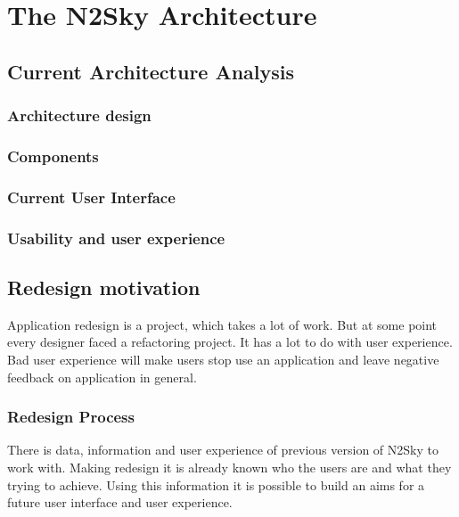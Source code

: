 \section{The N2Sky Architecture}\label{TheN2SkyArchitecture}

\subsection{Current Architecture Analysis}\label{CurrentArchitectureAnalysis}
\subsubsection{Architecture design}\label{Architecturedesign}
\subsubsection{Components}\label{Components}
\subsubsection{Current User Interface}\label{CurrentUserInterface}
\subsubsection{Usability and user experience}\label{Usabilityanduserexperience}



\subsection{Redesign motivation}\label{Redesignmotivation}

Application redesign is a project, which takes a lot of work. But at some point every designer faced a refactoring project. It has a lot to do with user experience. Bad user experience will make users stop use an application and leave negative feedback on application in general. 

\subsubsection{Redesign Process }\label{Redesign Process}

There is data, information and user experience of previous version of N2Sky to work with. Making redesign it is already known who the users are and what they trying to achieve.  Using this information it is possible to build an aims for a future user interface and user experience.


